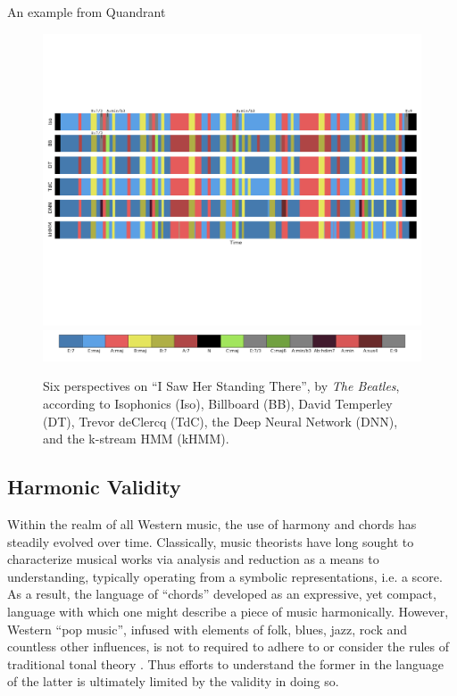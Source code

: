 \documentclass{article}
\begin{document}
An example from Quandrant

\begin{figure}[!t]
\centering
\includegraphics[width=\textwidth]{TROSSUK149E3AE03BD_annotations_mkup2}
\includegraphics[width=\textwidth]{TROSSUK149E3AE03BD_legend}
\caption{Six perspectives on ``I Saw Her Standing There'', by \emph{The Beatles}, according to Isophonics (Iso), Billboard (BB), David Temperley (DT), Trevor deClercq (TdC), the Deep Neural Network (DNN), and the k-stream HMM (kHMM).}
\label{fig:beatles}
\end{figure}

\subsection{Harmonic Validity}
\label{subsec:validity}

Within the realm of all Western music, the use of harmony and chords has steadily evolved over time.
Classically, music theorists have long sought to characterize musical works via analysis and reduction as a means to understanding, typically operating from a symbolic representations, i.e. a score.
As a result, the language of ``chords'' developed as an expressive, yet compact, language with which one might describe a piece of music harmonically.
However, Western ``pop music'', infused with elements of folk, blues, jazz, rock and countless other influences, is not to required to adhere to or consider the rules of traditional tonal theory \cite{Tagg1982Analysing}.
Thus efforts to understand the former in the language of the latter is ultimately limited by the validity in doing so.
\end{document}
